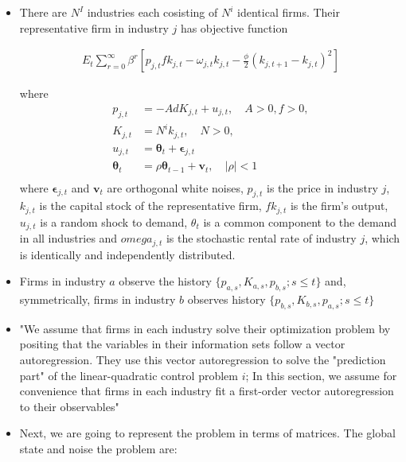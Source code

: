 \documentclass[11pt]{article}
\numberwithin{equation}{section}
\begin{document}
	\begin{itemize}
		\item There are $N^I$ industries each cosisting of $N^i$ identical firms. Their representative firm in industry $j$ has objective function 
		
		\begin{align*}
		E_t \sum_{r=0}^{\infty} \beta^r \left[p_{j,t} f k_{j,t} -\omega_{j,t} k_{j,t} - \frac{\phi}{2}\left(k_{j,t+1}-k_{j,t} \right)^2 \right]
		\end{align*}
		
		where 
		\begin{align*}
		p_{j,t} & = -A d K_{j,t} + u_{j,t},\quad A>0, f>0,\\
		K_{j,t} & = N^i k_{j,t}, \quad N>0,\\
		u_{j,t} & = \mathbf{\theta}_t + \mathbf{\epsilon}_{j,t} \\
		\mathbf{\theta}_t & = \rho \mathbf{\theta}_{t-1}+\mathbf{v}_t,\quad  |\rho| <1 \\ 
		\end{align*}
		where $\mathbf{\epsilon}_{j,t}$ and $\mathbf{v}_t$ are orthogonal white noises, $p_{j,t}$ is the price in industry $j$, $k_{j,t}$ is the capital stock of the representative firm, $f k_{j,t}$ is the firm's output, $u_{j,t}$ is a random shock to demand, $\theta_t$ is a common component to the demand in all industries and $omega_{j,t}$ is the stochastic rental rate of industry $j$, which is identically and independently distributed. 
		
		\item Firms in industry $a$ observe the history $\{p_{a,s}, K_{a,s}, p_{b,s};s\leq t\} $ and, symmetrically, firms in industry $b$ observes history $\{p_{b,s}, K_{b,s}, p_{a,s};s\leq t\} $
		
		\item "We assume that firms in each industry solve their optimization problem by positing that the variables in their information sets follow a vector autoregression. They use this vector autoregression to solve the "prediction part" of the linear-quadratic control problem $i$; In this section, we assume for convenience that firms in each industry fit a first-order vector autoregression to their observables" 
		
		\item Next, we are going to represent the problem in terms of matrices. The global state and noise the problem are:
		

\end{itemize}
\end{document}
